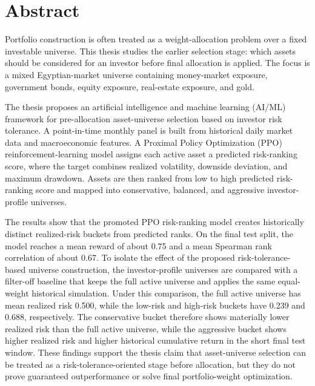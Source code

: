 \chapter*{Abstract}
{}
\label{chap:abstract}
Portfolio construction is often treated as a weight-allocation problem over a fixed investable universe. This thesis studies the earlier selection stage: which assets should be considered for an investor before final allocation is applied. The focus is a mixed Egyptian-market universe containing money-market exposure, government bonds, equity exposure, real-estate exposure, and gold.

The thesis proposes an artificial intelligence and machine learning (AI/ML) framework for pre-allocation asset-universe selection based on investor risk tolerance. A point-in-time monthly panel is built from historical daily market data and macroeconomic features. A Proximal Policy Optimization (PPO) reinforcement-learning model assigns each active asset a predicted risk-ranking score, where the target combines realized volatility, downside deviation, and maximum drawdown. Assets are then ranked from low to high predicted risk-ranking score and mapped into conservative, balanced, and aggressive investor-profile universes.

The results show that the promoted PPO risk-ranking model creates historically distinct realized-risk buckets from predicted ranks. On the final test split, the model reaches a mean reward of about 0.75 and a mean Spearman rank correlation of about 0.67. To isolate the effect of the proposed risk-tolerance-based universe construction, the investor-profile universes are compared with a filter-off baseline that keeps the full active universe and applies the same equal-weight historical simulation. Under this comparison, the full active universe has mean realized risk 0.500, while the low-risk and high-risk buckets have 0.239 and 0.688, respectively. The conservative bucket therefore shows materially lower realized risk than the full active universe, while the aggressive bucket shows higher realized risk and higher historical cumulative return in the short final test window. These findings support the thesis claim that asset-universe selection can be treated as a risk-tolerance-oriented stage before allocation, but they do not prove guaranteed outperformance or solve final portfolio-weight optimization.
